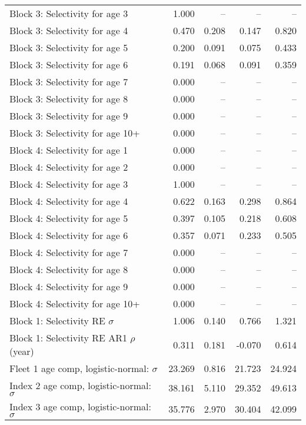 \documentclass[
]{article}
\begin{document}
\begin{landscape}
\begin{longtable}[t]{lrrrr}
\addlinespace
Block 3: Selectivity for age 3 & 1.000 & -- & -- & --\\
Block 3: Selectivity for age 4 & 0.470 & 0.208 & 0.147 & 0.820\\
Block 3: Selectivity for age 5 & 0.200 & 0.091 & 0.075 & 0.433\\
Block 3: Selectivity for age 6 & 0.191 & 0.068 & 0.091 & 0.359\\
Block 3: Selectivity for age 7 & 0.000 & -- & -- & --\\
\addlinespace
Block 3: Selectivity for age 8 & 0.000 & -- & -- & --\\
Block 3: Selectivity for age 9 & 0.000 & -- & -- & --\\
Block 3: Selectivity for age 10+ & 0.000 & -- & -- & --\\
Block 4: Selectivity for age 1 & 0.000 & -- & -- & --\\
Block 4: Selectivity for age 2 & 0.000 & -- & -- & --\\
\addlinespace
Block 4: Selectivity for age 3 & 1.000 & -- & -- & --\\
Block 4: Selectivity for age 4 & 0.622 & 0.163 & 0.298 & 0.864\\
Block 4: Selectivity for age 5 & 0.397 & 0.105 & 0.218 & 0.608\\
Block 4: Selectivity for age 6 & 0.357 & 0.071 & 0.233 & 0.505\\
Block 4: Selectivity for age 7 & 0.000 & -- & -- & --\\
\addlinespace
Block 4: Selectivity for age 8 & 0.000 & -- & -- & --\\
Block 4: Selectivity for age 9 & 0.000 & -- & -- & --\\
Block 4: Selectivity for age 10+ & 0.000 & -- & -- & --\\
Block 1: Selectivity RE $\sigma$ & 1.006 & 0.140 & 0.766 & 1.321\\
Block 1: Selectivity RE AR1 $\rho$ (year) & 0.311 & 0.181 & -0.070 & 0.614\\
\addlinespace
Fleet 1 age comp, logistic-normal: $\sigma$ & 23.269 & 0.816 & 21.723 & 24.924\\
Index 2 age comp, logistic-normal: $\sigma$ & 38.161 & 5.110 & 29.352 & 49.613\\
Index 3 age comp, logistic-normal: $\sigma$ & 35.776 & 2.970 & 30.404 & 42.099\\*
\end{longtable}
\end{landscape}
\end{document}
